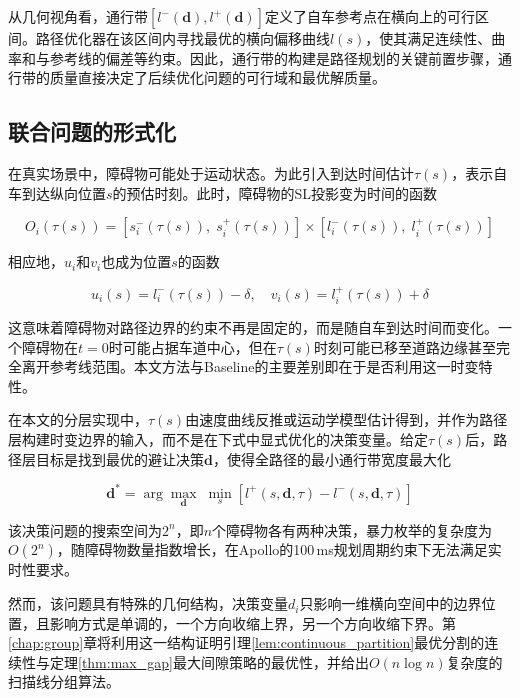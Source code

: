 从几何视角看，通行带$[l^{-}(\mathbf{d}), l^{+}(\mathbf{d})]$定义了自车参考点在横向上的可行区间。路径优化器在该区间内寻找最优的横向偏移曲线$l(s)$，使其满足连续性、曲率和与参考线的偏差等约束。因此，通行带的构建是路径规划的关键前置步骤，通行带的质量直接决定了后续优化问题的可行域和最优解质量。

\subsection{联合问题的形式化}
在真实场景中，障碍物可能处于运动状态。为此引入到达时间估计$\tau(s)$，表示自车到达纵向位置$s$的预估时刻。此时，障碍物的SL投影变为时间的函数

\begin{equation}
    O_i(\tau(s)) = [s_i^{-}(\tau(s)),\; s_i^{+}(\tau(s))] \times [l_i^{-}(\tau(s)),\; l_i^{+}(\tau(s))]
    \label{eq:time_varying_obs}
\end{equation}

相应地，$u_i$和$v_i$也成为位置$s$的函数

\begin{equation}
    u_i(s) = l_i^{-}(\tau(s)) - \delta, \quad v_i(s) = l_i^{+}(\tau(s)) + \delta
    \label{eq:time_varying_uv}
\end{equation}

这意味着障碍物对路径边界的约束不再是固定的，而是随自车到达时间而变化。一个障碍物在$t=0$时可能占据车道中心，但在$\tau(s)$时刻可能已移至道路边缘甚至完全离开参考线范围。本文方法与Baseline的主要差别即在于是否利用这一时变特性。

在本文的分层实现中，$\tau(s)$由速度曲线反推或运动学模型估计得到，并作为路径层构建时变边界的输入，而不是在下式中显式优化的决策变量。给定$\tau(s)$后，路径层目标是找到最优的避让决策$\mathbf{d}$，使得全路径的最小通行带宽度最大化

\begin{equation}
    \mathbf{d}^{*} = \arg\max_{\mathbf{d}} \;\min_{s} \left[l^{+}(s, \mathbf{d}, \tau) - l^{-}(s, \mathbf{d}, \tau)\right]
    \label{eq:joint_opt}
\end{equation}

该决策问题的搜索空间为$2^n$，即$n$个障碍物各有两种决策，暴力枚举的复杂度为$O(2^n)$，随障碍物数量指数增长，在Apollo的100\,ms规划周期约束下无法满足实时性要求。

然而，该问题具有特殊的几何结构，决策变量$d_i$只影响一维横向空间中的边界位置，且影响方式是单调的，一个方向收缩上界，另一个方向收缩下界。第\ref{chap:group}章将利用这一结构证明引理\ref{lem:continuous_partition}最优分割的连续性与定理\ref{thm:max_gap}最大间隙策略的最优性，并给出$O(n\log n)$复杂度的扫描线分组算法。


